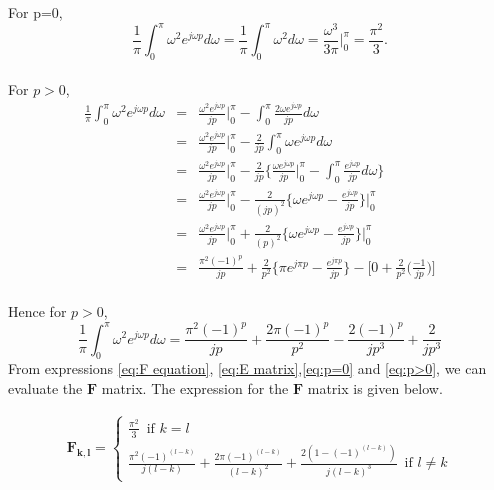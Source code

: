 \begin{appendix}
For p=0,
\begin{equation}
\frac{1}{\pi}\int_{0}^{\pi}\omega^{2} e^{j\omega p}d\omega=\frac{1}{\pi}\int_{0}^{\pi}\omega^{2}d\omega=\frac{\omega^3}{3\pi}\biggr\vert_{0}^{\pi}=\frac{\pi^2}{3}.
\label{eq:p=0}
\end{equation}\\
For $p>0$,
\begin{eqnarray*}
\frac{1}{\pi} \int_{0}^{\pi}\omega^{2} e^{j\omega p}d\omega &=& \frac{\omega^{2} e^{j\omega p}}{jp}\biggr\vert_{0}^{\pi}-\int_{0}^{\pi}\frac{2\omega e^{j\omega p}}{jp}d\omega \\
&=& \frac{\omega^{2} e^{j\omega p}}{jp}\biggr\vert_{0}^{\pi}-\frac{2}{jp}\int_{0}^{\pi} \omega e^{j\omega p}d\omega \\
&=&\frac{\omega^{2} e^{j\omega p}}{jp}\biggr\vert_{0}^{\pi}-\frac{2}{jp}\biggr\{ \frac{\omega e^{j\omega p}}{jp}\biggr\vert_{0}^{\pi}- \int_{0}^{\pi} \frac{ e^{j\omega p}}{jp}d\omega \biggr\}\\
&=&\frac{\omega^{2} e^{j\omega p}}{jp}\biggr\vert_{0}^{\pi}-\frac{2}{(jp)^{2}}\biggr\{ \omega e^{j\omega p}- \frac{ e^{j\omega p}}{jp} \biggr\}\biggr\vert_{0}^{\pi}\\
&=&\frac{\omega^{2} e^{j\omega p}}{jp}\biggr\vert_{0}^{\pi}+\frac{2}{(p)^{2}}\biggr\{ \omega e^{j\omega p}- \frac{ e^{j\omega p}}{jp} \biggr\}\biggr\vert_{0}^{\pi}\\
&=& \frac{\pi^{2}(-1)^{p}}{jp}+\frac{2}{p^2}\biggr\{\pi e^{j\pi p} - \frac{e^{j \pi p}}{jp}\biggr\}-\biggr[0+\frac{2}{p^2}\biggr(\frac{-1}{jp}\biggr)\biggr]\\
\end{eqnarray*}

Hence for $p>0$,
\begin{equation}
\frac{1}{\pi}\int_{0}^{\pi}\omega^{2} e^{j\omega p}d\omega= \frac{\pi^{2}(-1)^{p}}{jp}+\frac{2\pi (-1)^{ p}}{p^2}-\frac{2(-1)^p}{jp^3}+\frac{2}{jp^3}
\label{eq:p>0}
\end{equation}
From expressions \ref{eq:F equation}, \ref{eq:E matrix},\ref{eq:p=0} and \ref{eq:p>0}, we can evaluate the $\mathbf{F}$ matrix. The expression for the $\mathbf{F}$ matrix is given below.

 \begin{eqnarray}
 \label{Freq. Var. matrix}
 \mathbf{F_{k,l}} =  \begin{cases}
 \frac{\pi^2}{3}\,\,\, \text{if}\,\, k=l \\ 
 \frac{\pi^2{(-1)^{(l-k)}}}{j(l-k)} + \frac{2\pi{(-1)^{(l-k)}}}{(l-k)^2} + \frac{2\left(1 - {(-1)^{(l-k)}}\right)}{j{(l-k)^3}}\,\,\, \text{if}\,\, l \neq k
 \end{cases}
 \end{eqnarray}
\end{appendix}